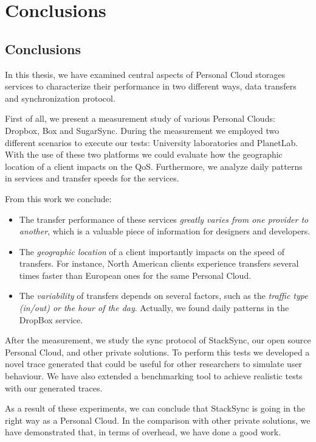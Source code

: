 \chapter{Conclusions}

\section{Conclusions}
In this thesis, we have examined central aspects of Personal Cloud storages 
services to characterize their performance in two different ways, data transfers
and synchronization protocol.

First of all, we present a measurement study of various Personal Clouds: Dropbox, Box and SugarSync.
During the measurement we employed two different scenarios to execute our tests:
University laboratories and PlanetLab. With the use of these two platforms we could
evaluate how the geographic location of a client impacts on the QoS. Furthermore, we analyze
daily patterns in services and transfer speeds for the services.

From this work we conclude:
\begin{itemize}
	\item The transfer performance of these services 
	\textit{greatly varies from one provider to another}, which is a valuable 
	piece of information for designers and developers.
	
	\item The \textit{geographic location} of a client importantly impacts on
	the speed of transfers. For instance, North American clients experience 
	transfers several times faster than European ones for the same Personal Cloud. 
	
	\item The \textit{variability} of transfers depends on several
	factors, such as the \textit{traffic type (in/out) or the hour of the day}.
	Actually, we found daily patterns in the DropBox service.
\end{itemize}

After the measurement, we study the sync protocol of StackSync, our open source Personal Cloud,
and other private solutions. To perform this tests we developed a novel trace generated
that could be useful for other researchers to simulate user behaviour. We have also extended
a benchmarking tool to achieve realistic tests with our generated traces.

As a result of these experiments, we can conclude that StackSync is going in the right
way as a Personal Cloud. In the comparison with other private solutions, we have demonstrated that,
in terms of overhead, we have done a good work.

